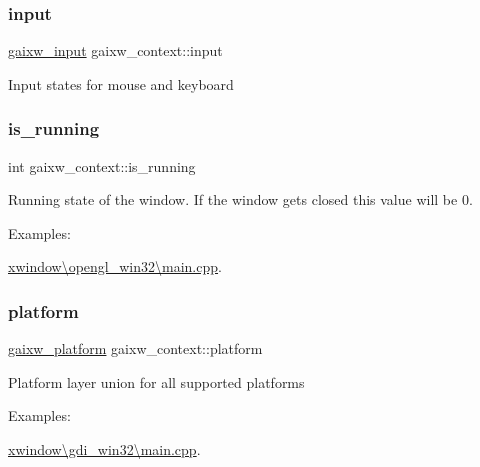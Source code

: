 \subsubsection{\texorpdfstring{input}{input}}
{\footnotesize\ttfamily \hyperlink{structgaixw__input}{gaixw\+\_\+input} gaixw\+\_\+context\+::input}

Input states for mouse and keyboard \mbox{\label{structgaixw__context_a7165f8e7f0c548dd3a11c8648fb8071a}} 
\subsubsection{\texorpdfstring{is\+\_\+running}{is\_running}}
{\footnotesize\ttfamily int gaixw\+\_\+context\+::is\+\_\+running}

Running state of the window. If the window gets closed this value will be 0. \begin{Desc}
\item[Examples\+: ]\par
\hyperlink{xwindow_0Copengl_win32_0Cmain_8cpp-example}{xwindow\textbackslash{}opengl\+\_\+win32\textbackslash{}main.\+cpp}.\end{Desc}
\mbox{\label{structgaixw__context_aa297ac21e147f4cde74e021b62b3e673}} 
\subsubsection{\texorpdfstring{platform}{platform}}
{\footnotesize\ttfamily \hyperlink{uniongaixw__platform}{gaixw\+\_\+platform} gaixw\+\_\+context\+::platform}

Platform layer union for all supported platforms \begin{Desc}
\item[Examples\+: ]\par
\hyperlink{xwindow_0Cgdi_win32_0Cmain_8cpp-example}{xwindow\textbackslash{}gdi\+\_\+win32\textbackslash{}main.\+cpp}.\end{Desc}
\mbox{\label{structgaixw__context_a5984d461e227d9028db4d9327bc9c2c4}} 
